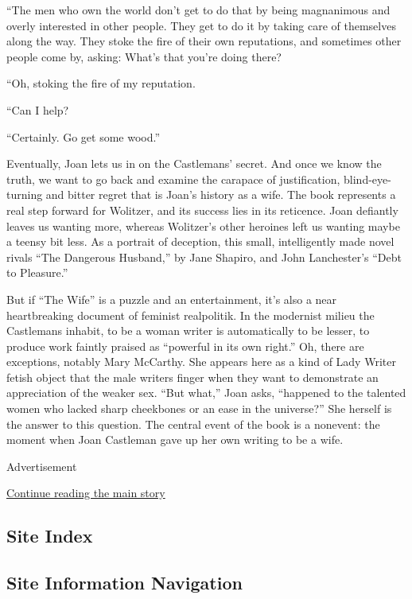 ``The men who own the world don't get to do that by being magnanimous
and overly interested in other people. They get to do it by taking care
of themselves along the way. They stoke the fire of their own
reputations, and sometimes other people come by, asking: What's that
you're doing there?

``Oh, stoking the fire of my reputation.

``Can I help?

``Certainly. Go get some wood.''

Eventually, Joan lets us in on the Castlemans' secret. And once we know
the truth, we want to go back and examine the carapace of justification,
blind-eye-turning and bitter regret that is Joan's history as a wife.
The book represents a real step forward for Wolitzer, and its success
lies in its reticence. Joan defiantly leaves us wanting more, whereas
Wolitzer's other heroines left us wanting maybe a teensy bit less. As a
portrait of deception, this small, intelligently made novel rivals ``The
Dangerous Husband,'' by Jane Shapiro, and John Lanchester's ``Debt to
Pleasure.''

But if ``The Wife'' is a puzzle and an entertainment, it's also a near
heartbreaking document of feminist realpolitik. In the modernist milieu
the Castlemans inhabit, to be a woman writer is automatically to be
lesser, to produce work faintly praised as ``powerful in its own
right.'' Oh, there are exceptions, notably Mary McCarthy. She appears
here as a kind of Lady Writer fetish object that the male writers finger
when they want to demonstrate an appreciation of the weaker sex. ``But
what,'' Joan asks, ``happened to the talented women who lacked sharp
cheekbones or an ease in the universe?'' She herself is the answer to
this question. The central event of the book is a nonevent: the moment
when Joan Castleman gave up her own writing to be a wife.

Advertisement

\protect\hyperlink{after-bottom}{Continue reading the main story}

\hypertarget{site-index}{%
\subsection{Site Index}\label{site-index}}

\hypertarget{site-information-navigation}{%
\subsection{Site Information
Navigation}\label{site-information-navigation}}

